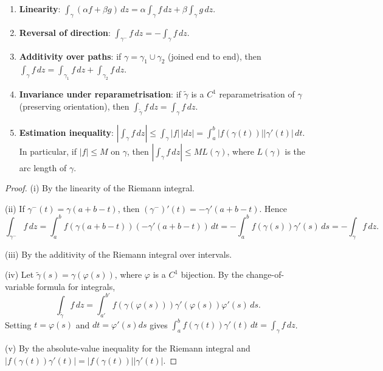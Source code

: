 \begin{proposition}\label{prop:ca_contour_integral_props}
\begin{enumerate}[label=(\roman*)]
    \item \textbf{Linearity}: $\int_\gamma (\alpha f + \beta g) \, dz = \alpha \int_\gamma f \, dz + \beta \int_\gamma g \, dz$.
    \item \textbf{Reversal of direction}: $\int_{\gamma^-} f \, dz = -\int_\gamma f \, dz$.
    \item \textbf{Additivity over paths}: if $\gamma = \gamma_1 \cup \gamma_2$ (joined end to end), then $\int_\gamma f \, dz = \int_{\gamma_1} f \, dz + \int_{\gamma_2} f \, dz$.
    \item \textbf{Invariance under reparametrisation}: if $\tilde{\gamma}$ is a $C^1$ reparametrisation of $\gamma$ (preserving orientation), then $\int_{\tilde{\gamma}} f \, dz = \int_\gamma f \, dz$.
    \item \textbf{Estimation inequality}: $\left| \int_\gamma f \, dz \right| \le \int_\gamma |f| \, |dz| = \int_a^b |f(\gamma(t))| |\gamma'(t)| \, dt$. In particular, if $|f| \le M$ on $\gamma$, then $\left| \int_\gamma f \, dz \right| \le M L(\gamma)$, where $L(\gamma)$ is the arc length of $\gamma$.
\end{enumerate}
\end{proposition}

\begin{proof}
(i) By the linearity of the Riemann integral.

(ii) If $\gamma^- (t) = \gamma(a + b - t)$, then $(\gamma^-)'(t) = -\gamma'(a + b - t)$. Hence
\[
\int_{\gamma^-} f \, dz = \int_a^b f(\gamma(a+b-t)) (-\gamma'(a+b-t)) \, dt = -\int_a^b f(\gamma(s)) \gamma'(s) \, ds = -\int_\gamma f \, dz.
\]

(iii) By the additivity of the Riemann integral over intervals.

(iv) Let $\tilde{\gamma}(s) = \gamma(\varphi(s))$, where $\varphi$ is a $C^1$ bijection. By the change-of-variable formula for integrals,
\[
\int_{\tilde{\gamma}} f \, dz = \int_{a'}^{b'} f(\gamma(\varphi(s))) \gamma'(\varphi(s)) \varphi'(s) \, ds.
\]
Setting $t = \varphi(s)$ and $dt = \varphi'(s) ds$ gives $\int_a^b f(\gamma(t)) \gamma'(t) \, dt = \int_\gamma f \, dz$.

(v) By the absolute-value inequality for the Riemann integral and $|f(\gamma(t)) \gamma'(t)| = |f(\gamma(t))| |\gamma'(t)|$.
\end{proof}

